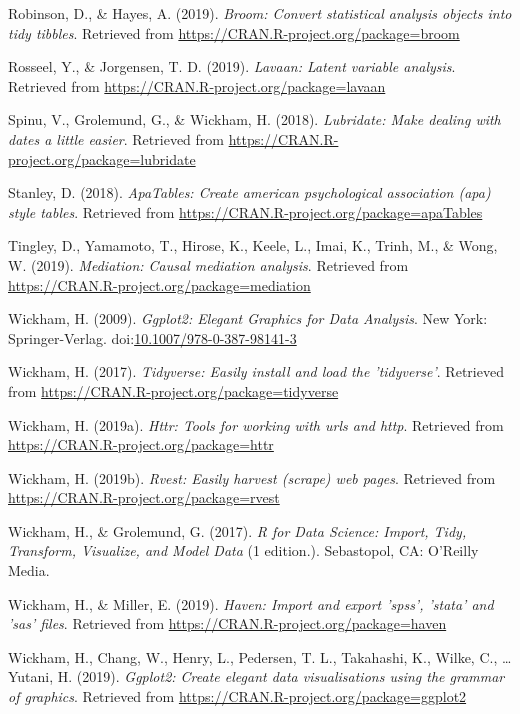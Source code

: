 \documentclass[doc,floatsintext]{apa6}
\begin{document}
\hypertarget{ref-R-broom}{}
Robinson, D., \& Hayes, A. (2019). \emph{Broom: Convert statistical
analysis objects into tidy tibbles}. Retrieved from
\url{https://CRAN.R-project.org/package=broom}

\hypertarget{ref-R-lavaan}{}
Rosseel, Y., \& Jorgensen, T. D. (2019). \emph{Lavaan: Latent variable
analysis}. Retrieved from
\url{https://CRAN.R-project.org/package=lavaan}

\hypertarget{ref-R-lubridate}{}
Spinu, V., Grolemund, G., \& Wickham, H. (2018). \emph{Lubridate: Make
dealing with dates a little easier}. Retrieved from
\url{https://CRAN.R-project.org/package=lubridate}

\hypertarget{ref-R-apaTables}{}
Stanley, D. (2018). \emph{ApaTables: Create american psychological
association (apa) style tables}. Retrieved from
\url{https://CRAN.R-project.org/package=apaTables}

\hypertarget{ref-R-mediation}{}
Tingley, D., Yamamoto, T., Hirose, K., Keele, L., Imai, K., Trinh, M.,
\& Wong, W. (2019). \emph{Mediation: Causal mediation analysis}.
Retrieved from \url{https://CRAN.R-project.org/package=mediation}

\hypertarget{ref-wickhamGgplot2ElegantGraphics2009}{}
Wickham, H. (2009). \emph{Ggplot2: Elegant Graphics for Data Analysis}.
New York: Springer-Verlag.
doi:\href{https://doi.org/10.1007/978-0-387-98141-3}{10.1007/978-0-387-98141-3}

\hypertarget{ref-R-tidyverse}{}
Wickham, H. (2017). \emph{Tidyverse: Easily install and load the
'tidyverse'}. Retrieved from
\url{https://CRAN.R-project.org/package=tidyverse}

\hypertarget{ref-R-httr}{}
Wickham, H. (2019a). \emph{Httr: Tools for working with urls and http}.
Retrieved from \url{https://CRAN.R-project.org/package=httr}

\hypertarget{ref-R-rvest}{}
Wickham, H. (2019b). \emph{Rvest: Easily harvest (scrape) web pages}.
Retrieved from \url{https://CRAN.R-project.org/package=rvest}

\hypertarget{ref-WickhamDataScienceImport2017}{}
Wickham, H., \& Grolemund, G. (2017). \emph{R for Data Science: Import,
Tidy, Transform, Visualize, and Model Data} (1 edition.). Sebastopol,
CA: O'Reilly Media.

\hypertarget{ref-R-haven}{}
Wickham, H., \& Miller, E. (2019). \emph{Haven: Import and export
'spss', 'stata' and 'sas' files}. Retrieved from
\url{https://CRAN.R-project.org/package=haven}

\hypertarget{ref-R-ggplot2}{}
Wickham, H., Chang, W., Henry, L., Pedersen, T. L., Takahashi, K.,
Wilke, C., \ldots{} Yutani, H. (2019). \emph{Ggplot2: Create elegant
data visualisations using the grammar of graphics}. Retrieved from
\url{https://CRAN.R-project.org/package=ggplot2}
\end{document}
